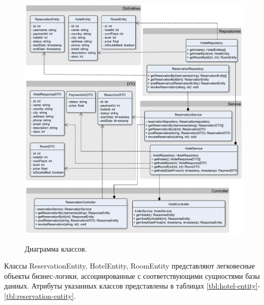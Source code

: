 \begin{figure}[h!]
	\begin{center}
		{\includegraphics[scale = 0.58]{img/diag_classes/classes.pdf}}
		\caption{Диаграмма классов.}
		\label{fig:diag-classes}
	\end{center}
\end{figure} 

Классы ReservationEntity, HotelEntity, RoomEntity представляют легковесные объекты бизнес-логики, ассоциированные с соответствующими сущностями базы данных. Атрибуты указанных классов представлены в таблицах \ref{tbl:hotel-entity}-\ref{tbl:reservation-entity}.

